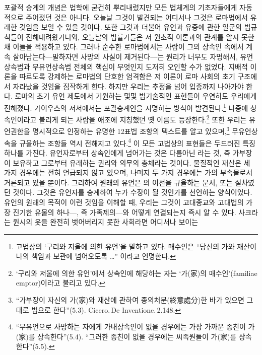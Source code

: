 포괄적 승계의 개념은 법학에 굳건히 뿌리내렸지만
모든 법체계의 기초자들에게 자동적으로 주어졌던 것은 아니다.
오늘날 그것이 발견되는 어디서나 그것은 로마법에서 유래한 것임을
보일 수 있을 것이다.
또한 그것과 더불어 유언과 유증에 관한 일군의 법규칙들이 전해내려왔거니와,
오늘날의 법률가들은 저 원초적 이론과의 관계를 알지 못한 채 이들을 적용하고 있다.
그러나 순수한 로마법에서는 사람이 그의 상속인 속에서
계속 살아남는다---말하자면 사망의 사실이 제거된다---는
원리가 너무도 자명해서, 유언상속법과 무유언상속법 전체의 핵심이
무엇인지 도저히 오인할 수가 없었다.
지배적 이론을 따르도록 강제하는 로마법의 단호한 엄격함은
저 이론이 로마 사회의 초기 구조에서 자라났을 것임을 짐작하게 한다.
하지만 우리는 추정을 넘어 입증까지 나아가야 한다.
로마의 초기 유언 제도에서 기원하는
몇몇 법기술적인 표현들이 우연히도 우리에게 전해졌다.
가이우스의 저서에서는 포괄승계인을 지명하는 방식이
발견된다.\footnote{고법상의 `구리와 저울에 의한 유언'을 말하고 있다.
  매수인은 ``당신의 가와 재산이 나의 책임과 보관에 넘어오도록 \ldots''
  이라고 언명한다. }
나중에 상속인이라고 불리게 되는 사람을 애초에 지칭했던 옛 이름도
등장한다.\footnote{`구리와 저울에 의한 유언'에서
  상속인에 해당하는 자는 `가(家)의 매수인'(familiae emptor)이라고
  불리고 있다. }
또한 우리는 유언권한을 명시적으로 인정하는
유명한 12표법 조항의 텍스트를 알고 있으며,\footnote{%
  ``가부장이 자신의 가(家)와 재산에 관하여 종의처분(終意處分)한 바가 있으면
  그대로 법으로 한다''(5.3). Cicero.\,De Inventione.\,2.148.}
무유언상속을 규율하는 조항들 역시 전해지고 있다.\footnote{``무유언으로
  사망하는 자에게 가내상속인이 없을 경우에는 가장 가까운 종친이
  가(家)를 상속한다''(5.4).
  ``그러한 종친이 없을 경우에는 씨족원들이 가(家)를 상속한다''(5.5). }
이 모든 고법상의 표현들은 두드러진 특징 하나를 가진다.
유언자로부터 상속인에게 넘어가는 것은 다름아닌 라는 것,
즉 가부장이 보유하고 그로부터 유래하는 권리와 의무의 총체라는 것이다.
물질적인 재산은 세 가지 경우에는 전혀 언급되지 않고 있으며,
나머지 두 가지 경우에는 가의 부속물로서 거론되고 있을 뿐이다.
그리하여 원래의 유언은 의 이전을 규율하는 문서,
또는  절차였던 것이다.
그것은 유언자를 승계하여 누가 수장이 될 것인가를 선언하는
양식이었다.
유언의 원래의 목적이 이런 것임을 이해할 때,
우리는 그것이 고대종교와 고대법의 가장 진기한 유물의
하나---, 즉 가족제의---와
어떻게 연결되는지 즉시 알 수 있다.
사크라는 원시의 옷을 완전히 벗어버리지 못한 사회라면 어디서나 보이는

